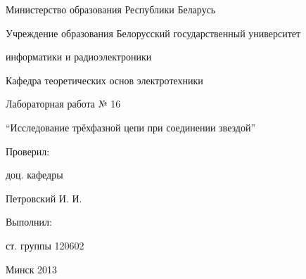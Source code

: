 \thispagestyle{empty}

\begin{center}
Министерство образования Республики Беларусь\par
\vspace{2mm}
Учреждение образования Белорусский государственный университет\par
информатики и радиоэлектроники\par 
\vspace{2mm}
Кафедра теоретических основ электротехники\par

\end{center}

\vspace{70mm}

\begin{center}
Лабораторная работа № 16\par
``Исследование трёхфазной цепи при соединении звездой''\par
\end{center}

\vspace{50mm}

\begin{multicols}{2}
Проверил:

доц. кафедры 

Петровский И. И.
\begin{flushright}
Выполнил:

ст. группы 120602


\end{flushright}
\end{multicols}

\vspace{50mm}
\begin{center}
Минск 2013
\end{center}

\newpage
